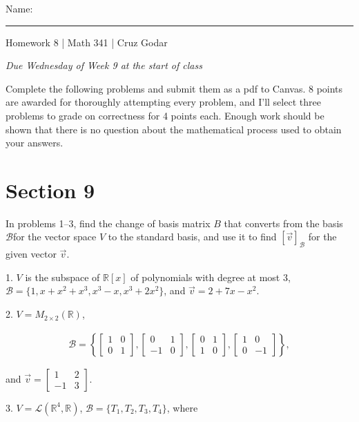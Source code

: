 \documentclass{article}
\begin{document}
\Large Name: \rule{2in}{0.15mm} \hfill Homework 8 | Math 341 | Cruz Godar \vspace{4pt} \normalsize

\textit{Due Wednesday of Week 9 at the start of class}

Complete the following problems and submit them as a pdf to Canvas. 8 points are awarded for thoroughly attempting every problem, and I'll select three problems to grade on correctness for 4 points each. Enough work should be shown that there is no question about the mathematical process used to obtain your answers.

\section{Section 9}

In problems 1--3, find the change of basis matrix $B$ that converts from the basis $\mathcal{B}$for the vector space $V$ to the standard basis, and use it to find $[\vec{v}]_\mathcal{B}$ for the given vector $\vec{v}$.

1. $V$ is the subspace of $\mathbb{R}[x]$ of polynomials with degree at most $3$, $\mathcal{B} = \{1, x + x^2 + x^3, x^3 - x, x^3 + 2x^2\}$, and $\vec{v} = 2 + 7x - x^2$.

2. $V = M_{2 \times 2}(\mathbb{R})$,

\begin{align*}
	\mathcal{B} = \left\{ \left[\begin{array}{cc} 1& 0 \\ 0& 1 \end{array}\right], \left[\begin{array}{cc} 0& 1 \\ -1& 0 \end{array}\right], \left[\begin{array}{cc} 0& 1 \\ 1& 0 \end{array}\right], \left[\begin{array}{cc} 1& 0 \\ 0& -1 \end{array}\right] \right\},
\end{align*}

and $\vec{v} = \left[\begin{array}{cc} 1& 2 \\ -1& 3 \end{array}\right]$.

3. $V = \mathcal{L}(\mathbb{R}^4, \mathbb{R})$, $\mathcal{B} = \{T_1, T_2, T_3, T_4\}$, where
\end{document}
